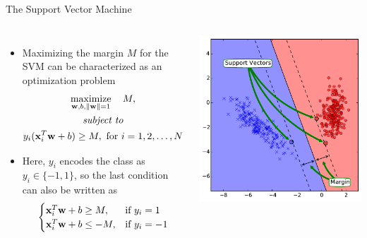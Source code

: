 \documentclass[10pt, aspectratio=169]{beamer} %
\newcommand{\w}{{\bf w}}
\newcommand{\x}{{\bf x}}
\begin{document}
\begin{frame}[fragile,allowframebreaks=0.8]
 {The Support Vector Machine}
\begin{columns}[onlytextwidth]
\begin{itemize}
\item Maximizing the margin $M$ for the SVM can be characterized as an optimization problem
\begin{gather*}
 \mathop{\text{maximize}}_{\w, b, \|\w\| = 1}  \quad M,  \\
 \textit{subject to} \\
 y_i(\x_i^T\w + b) \geq M, \text{ for } i = 1,2,\ldots, N 
\end{gather*}
\item Here, $y_i$ encodes the class as $y_i\in \{-1, 1\}$, so the last condition
can also be written as
\[
\begin{cases}
\x_i^T\w + b 
\geq M, & \text{if } y_i = 1\\
\x_i^T\w + b \leq -M, & \text{if } y_i = -1
\end{cases}
\]
\end{itemize}
\includegraphics[width=\columnwidth]{SVM_boundary.pdf}
\end{columns}
\end{frame}
\end{document}
